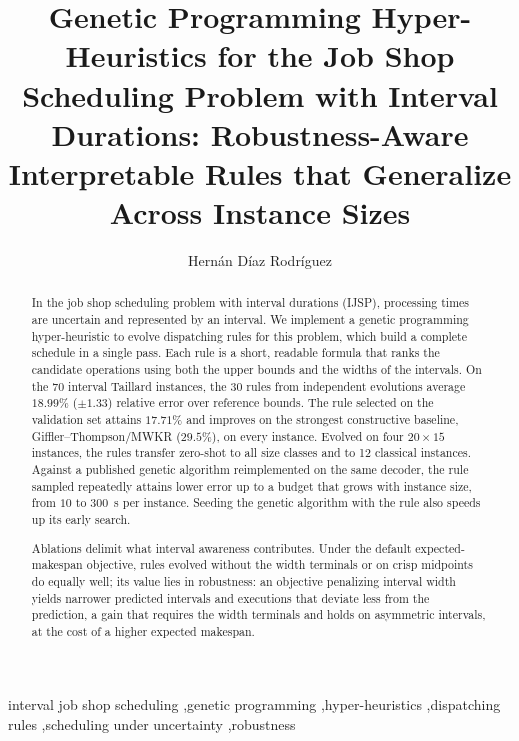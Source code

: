 \documentclass[preprint,number,sort&compress,12pt]{elsarticle}
\begin{document}
\begin{frontmatter}

\title{Genetic Programming Hyper-Heuristics for the Job Shop Scheduling
Problem with Interval Durations: Robustness-Aware Interpretable Rules
that Generalize Across Instance Sizes}

\author{Hern\'an D\'iaz Rodr\'iguez}

\begin{abstract}
In the job shop scheduling problem with interval durations (IJSP),
processing times are uncertain and represented by an interval. We
implement a genetic programming
hyper-heuristic to evolve dispatching rules for this problem, which build
a complete schedule in a single pass. Each rule is a
short, readable formula that ranks the candidate operations using both
the upper bounds and the widths of the intervals. On the 70
interval Taillard instances, the 30 rules from independent evolutions
average $18.99\%$ ($\pm1.33$) relative error over reference
bounds. The rule selected on the validation set attains $17.71\%$ and
improves on the strongest constructive baseline, Giffler--Thompson/MWKR
($29.5\%$), on every instance. Evolved on four $20{\times}15$ instances,
the rules transfer zero-shot to all size classes and to 12 classical
instances. Against a published genetic algorithm reimplemented on the same
decoder, the rule sampled repeatedly attains lower error up to a budget
that grows with instance size, from $10$ to $300$~s per instance.
Seeding the genetic algorithm with the rule also speeds up its early
search.

Ablations delimit what interval awareness
contributes. Under the default expected-makespan objective, rules
evolved without the width terminals or on crisp midpoints do equally
well; its value lies
in robustness: an objective penalizing interval width yields narrower
predicted intervals and executions that deviate less from the
prediction, a gain
that requires the width terminals and holds on asymmetric intervals, at
the cost of a higher expected makespan.
\end{abstract}

\begin{keyword}
interval job shop scheduling \sep genetic programming \sep hyper-heuristics
\sep dispatching rules \sep scheduling under uncertainty \sep robustness
\end{keyword}

\end{frontmatter}
\end{document}
